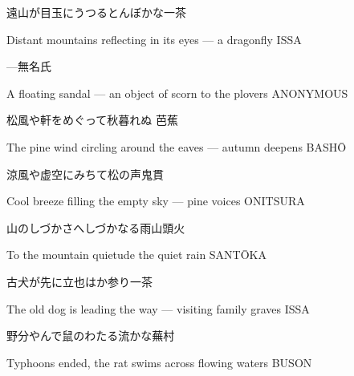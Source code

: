 \begin{haiku}
    {\FH 遠山が目玉にうつるとんぼかな}\hfill{\FH 一茶}

    \vin{} Distant mountains
    \vin{} \vin{} reflecting in its eyes ---
    \vin{} \vin{} \vin{} a dragonfly \hspace{\fill} ISSA
\end{haiku}

\begin{haiku}
    {---}\hfill{\FH 無名氏}

    \vin{} A floating sandal ---
    \vin{} \vin{} an object of scorn
    \vin{} \vin{} \vin{} to the plovers \hspace{\fill} ANONYMOUS
\end{haiku}

\begin{haiku}
    {\FH 松風や軒をめぐって秋暮れぬ }\hfill{\FH 芭蕉}

    \vin{} The pine wind
    \vin{} \vin{} circling around the eaves ---
    \vin{} \vin{} \vin{} autumn deepens \hspace{\fill} BASH\={O}
\end{haiku}

\begin{haiku}
    {\FH 涼風や虚空にみちて松の声}\hfill{\FH 鬼貫}

    \vin{} Cool breeze
    \vin{} \vin{} filling the empty sky ---
    \vin{} \vin{} \vin{} pine voices \hspace{\fill} ONITSURA
\end{haiku}

\begin{haiku}
    {\FH 山のしづかさへしづかなる雨}\hfill{\FH 山頭火}

    \vin{} To the mountain quietude
    \vin{} \vin{} the quiet
    \vin{} \vin{} \vin{} rain \hspace{\fill} SANT\={O}KA
\end{haiku}

\begin{haiku}
    {\FH 古犬が先に立也はか参り}\hfill{\FH 一茶}

    \vin{} The old dog
    \vin{} \vin{} is leading the way ---
    \vin{} \vin{} \vin{} visiting family graves \hspace{\fill} ISSA
\end{haiku}

\begin{haiku}
    {\FH 野分やんで鼠のわたる流かな}\hfill{\FH 蕪村}

    \vin{} Typhoons ended,
    \vin{} \vin{} the rat swims across
    \vin{} \vin{} \vin{} flowing waters \hspace{\fill} BUSON
\end{haiku}


